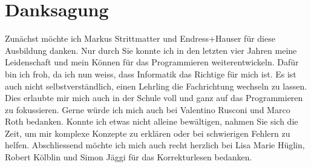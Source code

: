\chapter*{Danksagung}
\vspace{-3cm}
Zunächst möchte ich Markus Strittmatter und Endress+Hauser für diese Ausbildung danken. Nur durch Sie konnte ich in den letzten vier Jahren meine Leidenschaft und mein Können für das Programmieren weiterentwickeln. Dafür bin ich froh, da ich nun weiss, dass Informatik das Richtige für mich ist. Es ist auch nicht selbstverständlich, einen Lehrling die Fachrichtung wechseln zu lassen. Dies erlaubte mir mich auch in der Schule voll und ganz auf das Programmieren zu fokussieren.
\newline
\newline
Gerne würde ich mich auch bei Valentino Rusconi und Marco Roth bedanken. Konnte ich etwas nicht alleine bewältigen, nahmen Sie sich die Zeit, um mir komplexe Konzepte zu erklären oder bei schwierigen Fehlern zu helfen.
\newline
\newline
Abschliessend möchte ich mich auch recht herzlich bei Lisa Marie Hüglin, Robert Kölblin und Simon Jäggi für das Korrekturlesen bedanken.